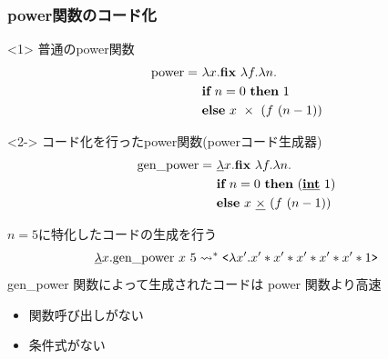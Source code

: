 \begin{frame}
  \frametitle{power関数のコード化}
  \begin{onlyenv}<1>
    普通のpower関数
    \begin{align*}
      \text{power} =~ &\lambda x. \textbf{fix}~ \lambda f. \lambda n. \\
                      &\textbf{if}~ n=0~ \textbf{then}~  1 \\
                      &\textbf{else}~ x~ \times~ (f~ (n - 1))
    \end{align*}
  \end{onlyenv}

  \begin{onlyenv}<2->
    コード化を行ったpower関数(powerコード生成器)
    \begin{align*}
      \text{gen\_power} =~ &\underline{\lambda} x. \textbf{fix}~ \lambda f. \lambda n. \\
                           &\textbf{if}~ n=0~ \textbf{then}~ (\underline{\textbf{int}}~ 1) \\
                           &\textbf{else}~ x~ \underline{\textbf{$\times$}}~ (f~ (n - 1))
    \end{align*}
  \end{onlyenv}

  \pause
  \pause
  $n = 5$に特化したコードの生成を行う
  \pause
  \begin{align*}
    \underline{\lambda}{x}.{\text{gen\_power}~ x~ 5} \leadsto^* \texttt{<}{\lambda{x'}.{x' * x' * x' * x' * x' * 1}}\texttt{>}
  \end{align*}
  \pause
  gen\_power 関数によって生成されたコードは power 関数より高速
  \begin{itemize}
  \item 関数呼び出しがない
  \item 条件式がない
  \end{itemize}
\end{frame}




